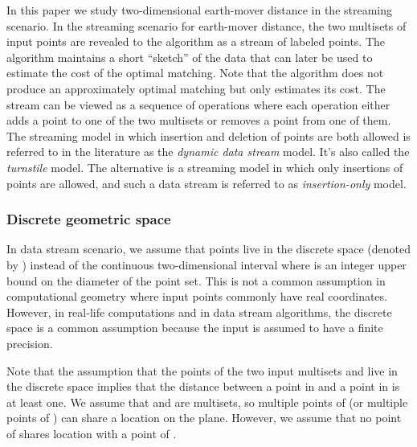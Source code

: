 \documentclass[oribibl]{llncs}
\begin{document}
In this paper we study two-dimensional earth-mover distance in the
streaming scenario.
In the streaming scenario for earth-mover distance, the two multisets of input
points are revealed to the algorithm as a stream of labeled points. The
algorithm maintains a short ``sketch'' of the data that can later be used to 
estimate the cost of the optimal matching. Note that the algorithm
does not produce an approximately optimal matching but only estimates its cost. 
The stream can be viewed as a
sequence of  operations where each operation either adds a point to one of
the two multisets or removes a point from one of them. 
The streaming model in which insertion and deletion of
points are both allowed is referred to in the literature as the \textit{dynamic
data stream} model. It's also called the \textit{turnstile} model.
The alternative is a streaming model in which only insertions of points are
allowed, and such a data stream is referred to as \textit{insertion-only} model.

\subsubsection{Discrete geometric space}
In data stream scenario, we assume that points live in the discrete space
 (denoted by ) instead of the continuous
two-dimensional interval 
where  is an integer upper bound on the diameter of the point set.
This is not a common assumption in computational geometry where input points
commonly have real coordinates. However, in real-life computations and in data
stream algorithms, the discrete space is a common assumption because the input
is assumed to have a finite precision.

Note that the assumption that the points of the two input multisets  and 
live in the discrete space  implies that the distance between 
a point in  and a point in  is at least one. We assume that  and 
are multisets, so multiple points of  (or multiple points of )
can share a location on the plane. However, we assume
that no point of  shares location with a point of . 
\end{document}
